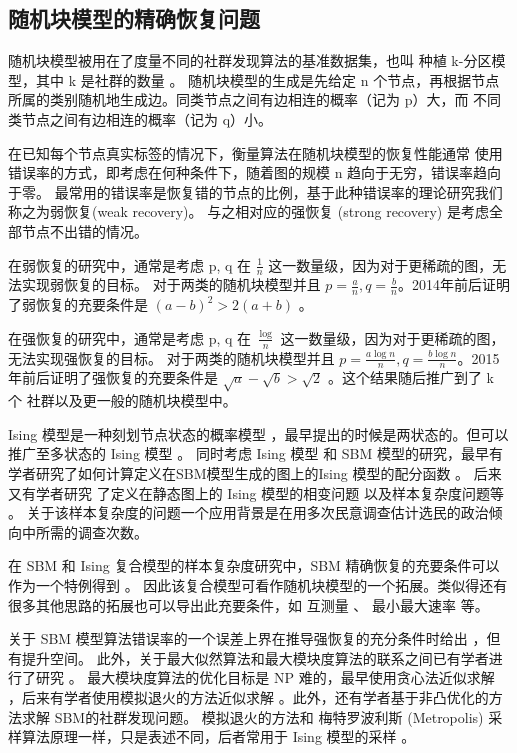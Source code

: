 \subsection{随机块模型的精确恢复问题}
随机块模型被用在了度量不同的社群发现算法的基准数据集，也叫 种植 k-分区模型，其中 k 是社群的数量 。
随机块模型的生成是先给定 n 个节点，再根据节点所属的类别随机地生成边。同类节点之间有边相连的概率（记为 p）大，而
不同类节点之间有边相连的概率（记为 q）小。\cite{abbe2017community}

在已知每个节点真实标签的情况下，衡量算法在随机块模型的恢复性能通常
使用错误率的方式，即考虑在何种条件下，随着图的规模 n 趋向于无穷，错误率趋向于零。
最常用的错误率是恢复错的节点的比例，基于此种错误率的理论研究我们称之为弱恢复(weak recovery)。
与之相对应的强恢复 (strong recovery) 是考虑全部节点不出错的情况。

在弱恢复的研究中，通常是考虑 p, q 在 $\frac{1}{n}$ 这一数量级，因为对于更稀疏的图，无法实现弱恢复的目标。
对于两类的随机块模型并且 $p=\frac{a}{n}, q = \frac{b}{n}$。2014年前后证明了弱恢复的充要条件是 $(a-b)^2 > 2(a+b)$
\cite{mossel2015reconstruction, mossel2018proof}。

在强恢复的研究中，通常是考虑 p, q 在 $\frac{\log}{n}$ 这一数量级，因为对于更稀疏的图，无法实现强恢复的目标。
对于两类的随机块模型并且 $p=\frac{a \log n}{n}, q = \frac{b \log n }{n}$。2015年前后证明了强恢复的充要条件是
$\sqrt{a} - \sqrt{b} > \sqrt{2}$ \cite{abbe2015exact, mossel2016}。这个结果随后推广到了 k 个
社群以及更一般的随机块模型中\cite{abbe2015community}。

Ising 模型是一种刻划节点状态的概率模型 \cite{ising1925beitrag}，最早提出的时候是两状态的。但可以推广至多状态的 Ising 模型 \cite{potts1952some}。
同时考虑 Ising 模型 和 SBM 模型的研究，最早有学者研究了如何计算定义在SBM模型生成的图上的Ising 模型的配分函数 \cite{liu2017log}。
后来又有学者研究 了定义在静态图上的 Ising 模型的相变问题 \cite{berthet2019exact} 以及样本复杂度问题等 \cite{ye2020exact}。
关于该样本复杂度的问题一个应用背景是在用多次民意调查估计选民的政治倾向中所需的调查次数。

在 SBM 和 Ising 复合模型的样本复杂度研究中，SBM 精确恢复的充要条件可以作为一个特例得到 \cite{ye2020exact}。
因此该复合模型可看作随机块模型的一个拓展。类似得还有很多其他思路的拓展也可以导出此充要条件，如 互测量 \cite{chen2016information}、 最小最大速率 \cite{zhang2016} 等。

关于 SBM 模型算法错误率的一个误差上界在推导强恢复的充分条件时给出 \cite{abbe2015exact}，但有提升空间。
此外，关于最大似然算法和最大模块度算法的联系之间已有学者进行了研究 \cite{newman2016equivalence}。
最大模块度算法的优化目标是 NP 难的，最早使用贪心法近似求解 \cite{clauset2004finding}，后来有学者使用模拟退火的方法近似求解 \cite{he2016fast}。此外，还有学者基于非凸优化的方法求解 SBM的社群发现问题\cite{wang2021non}。
模拟退火的方法和 梅特罗波利斯 (Metropolis) 采样算法原理一样，只是表述不同，后者常用于 Ising 模型的采样 \cite{metropolis1953equation}。

